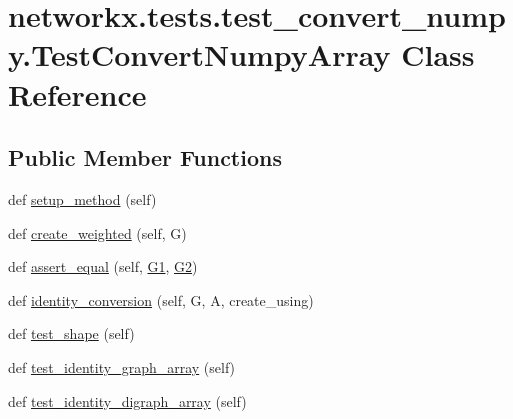 \hypertarget{classnetworkx_1_1tests_1_1test__convert__numpy_1_1TestConvertNumpyArray}{}\section{networkx.\+tests.\+test\+\_\+convert\+\_\+numpy.\+Test\+Convert\+Numpy\+Array Class Reference}
\label{classnetworkx_1_1tests_1_1test__convert__numpy_1_1TestConvertNumpyArray}
\subsection*{Public Member Functions}
\begin{DoxyCompactItemize}
\item 
def \hyperlink{classnetworkx_1_1tests_1_1test__convert__numpy_1_1TestConvertNumpyArray_ac6adf259c87651121c95b9e751fdcc2e}{setup\+\_\+method} (self)
\item 
def \hyperlink{classnetworkx_1_1tests_1_1test__convert__numpy_1_1TestConvertNumpyArray_abd43f8c9e88af8d88c7e1b500c4e06b1}{create\+\_\+weighted} (self, G)
\item 
def \hyperlink{classnetworkx_1_1tests_1_1test__convert__numpy_1_1TestConvertNumpyArray_a29102f7ca9348c15d83f793a9a471c24}{assert\+\_\+equal} (self, \hyperlink{classnetworkx_1_1tests_1_1test__convert__numpy_1_1TestConvertNumpyArray_a04d5a733720580f5037b8134ebe52b73}{G1}, \hyperlink{classnetworkx_1_1tests_1_1test__convert__numpy_1_1TestConvertNumpyArray_a0ccb237a760b3c34a2ce91e0248b6f9c}{G2})
\item 
def \hyperlink{classnetworkx_1_1tests_1_1test__convert__numpy_1_1TestConvertNumpyArray_aa501454e41645b45ba47cf521e4645f0}{identity\+\_\+conversion} (self, G, A, create\+\_\+using)
\item 
def \hyperlink{classnetworkx_1_1tests_1_1test__convert__numpy_1_1TestConvertNumpyArray_a5bdfead9765110a389392c8d0904832e}{test\+\_\+shape} (self)
\item 
def \hyperlink{classnetworkx_1_1tests_1_1test__convert__numpy_1_1TestConvertNumpyArray_aa7d5fd4b1b977fa48f7a7a15a6f8416f}{test\+\_\+identity\+\_\+graph\+\_\+array} (self)
\item 
def \hyperlink{classnetworkx_1_1tests_1_1test__convert__numpy_1_1TestConvertNumpyArray_ab8dbfcd604f4c11c9bab915c6d117183}{test\+\_\+identity\+\_\+digraph\+\_\+array} (self)
\item 

\end{DoxyCompactItemize}
